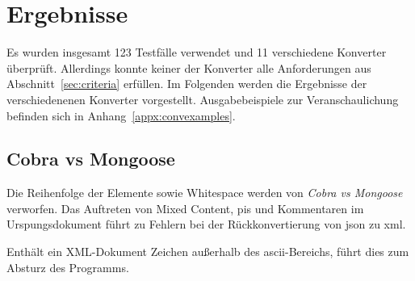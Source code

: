 \chapter{Ergebnisse} \label{chap:results}

\begin{figure}[b!]
    
    \label{tbl:results-basic}
\end{figure}

\begin{figure}[t!]
    
    \label{tbl:results-chars}
\end{figure}

\begin{figure}[t!]
    
    \label{tbl:results-complex}
\end{figure}

\begin{figure}[t!]
    
    \label{tbl:results-sec}
\end{figure}

Es wurden insgesamt 123 Testfälle verwendet und 11 verschiedene Konverter überprüft. Allerdings konnte keiner der Konverter alle Anforderungen aus Abschnitt~\ref{sec:criteria} erfüllen.
Im Folgenden werden die Ergebnisse der verschiedenenen Konverter vorgestellt. Ausgabebeispiele zur Veranschaulichung befinden sich in Anhang~\ref{appx:convexamples}.

\section{Cobra vs Mongoose}
\label{sec:cobravsmongoose}

Die Reihenfolge der Elemente sowie Whitespace werden von \emph{Cobra vs Mongoose} verworfen. Das Auftreten von Mixed Content, \glspl{pi} und Kommentaren im Urspungsdokument führt zu Fehlern bei der Rückkonvertierung von \acrshort{json} zu \acrshort{xml}.

Enthält ein XML-Dokument Zeichen außerhalb des \acrshort{ascii}-Bereichs, führt dies zum Absturz des Programms.

